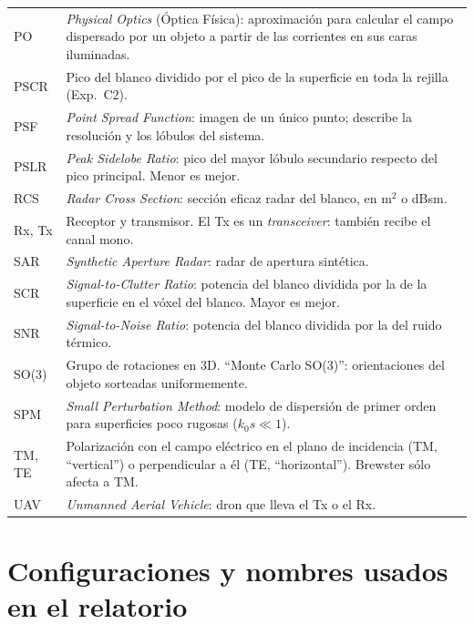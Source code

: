 \begin{longtable}{@{}L{2.4cm}L{12.0cm}@{}}
PO & \emph{Physical Optics} (Óptica Física): aproximación para calcular el campo dispersado por
     un objeto a partir de las corrientes en sus caras iluminadas. \\
PSCR & Pico del blanco dividido por el pico de la superficie en toda la rejilla (Exp.~C2). \\
PSF & \emph{Point Spread Function}: imagen de un único punto; describe la resolución y los
      lóbulos del sistema. \\
PSLR & \emph{Peak Sidelobe Ratio}: pico del mayor lóbulo secundario respecto del pico principal.
       Menor es mejor. \\
RCS & \emph{Radar Cross Section}: sección eficaz radar del blanco, en m$^2$ o dBsm. \\
Rx, Tx & Receptor y transmisor. El Tx es un \emph{transceiver}: también recibe el canal mono. \\
SAR & \emph{Synthetic Aperture Radar}: radar de apertura sintética. \\
SCR & \emph{Signal-to-Clutter Ratio}: potencia del blanco dividida por la de la superficie en el
      vóxel del blanco. Mayor es mejor. \\
SNR & \emph{Signal-to-Noise Ratio}: potencia del blanco dividida por la del ruido térmico. \\
SO(3) & Grupo de rotaciones en 3D. ``Monte Carlo SO(3)'': orientaciones del objeto sorteadas
        uniformemente. \\
SPM & \emph{Small Perturbation Method}: modelo de dispersión de primer orden para superficies
      poco rugosas ($k_0s\ll1$). \\
TM, TE & Polarización con el campo eléctrico en el plano de incidencia (TM, ``vertical'') o
         perpendicular a él (TE, ``horizontal''). Brewster sólo afecta a TM. \\
UAV & \emph{Unmanned Aerial Vehicle}: dron que lleva el Tx o el Rx. \\
\bottomrule
\end{longtable}

\section*{Configuraciones y nombres usados en el relatorio}

